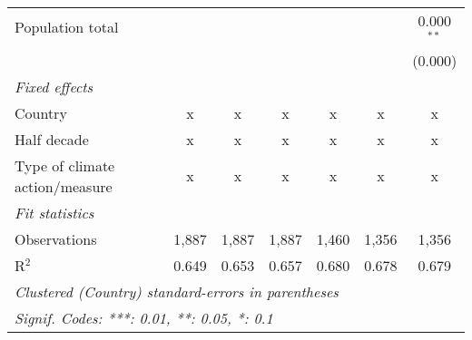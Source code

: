 \begin{tabular}{lcccccc}
   Population total                                                     &         &                &                &                &                & 0.000$^{**}$\\   
                                                                        &         &                &                &                &                & (0.000)\\   
   \emph{Fixed effects}\\
   Country                                                              & x       & x              & x              & x              & x              & x\\  
   Half decade                                                          & x       & x              & x              & x              & x              & x\\  
   Type of climate action/measure                                       & x       & x              & x              & x              & x              & x\\  
   \midrule \emph{Fit statistics}\\
   Observations                                                         & 1,887   & 1,887          & 1,887          & 1,460          & 1,356          & 1,356\\  
   R$^2$                                                                & 0.649   & 0.653          & 0.657          & 0.680          & 0.678          & 0.679\\  
   \midrule
   \multicolumn{7}{l}{\emph{Clustered (Country) standard-errors in parentheses}}\\
   \multicolumn{7}{l}{\emph{Signif. Codes: ***: 0.01, **: 0.05, *: 0.1}}\\
\end{tabular}
\par\endgroup


